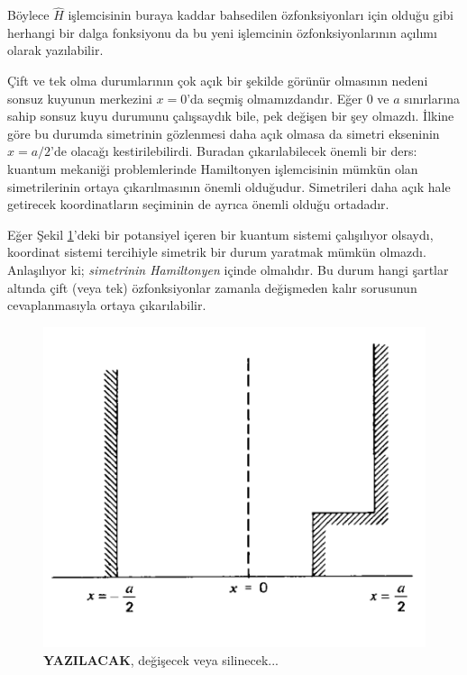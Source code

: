 \documentclass[a4paper,12pt, twoside]{article}
\newcommand{\YAZILACAK}{{\vspace{18pt}\bf\Large \color{red} YAZILACAK}}
\begin{document}
Böylece $\hat H$ işlemcisinin buraya kaddar bahsedilen özfonksiyonları için olduğu gibi herhangi bir dalga fonksiyonu da bu yeni işlemcinin özfonksiyonlarının açılımı olarak yazılabilir.

Çift ve tek olma durumlarının çok açık bir şekilde görünür olmasının nedeni sonsuz kuyunun merkezini $x=0$'da seçmiş olmamızdandır. Eğer $0$ ve $a$ sınırlarına sahip sonsuz kuyu durumunu çalışsaydık bile, pek değişen bir şey olmazdı. İlkine göre bu durumda simetrinin gözlenmesi daha açık olmasa da simetri ekseninin $x=a/2$'de olacağı kestirilebilirdi. Buradan çıkarılabilecek önemli bir ders: kuantum mekaniği problemlerinde Hamiltonyen işlemcisinin mümkün olan simetrilerinin ortaya çıkarılmasının önemli olduğudur. Simetrileri daha açık hale getirecek koordinatların seçiminin de ayrıca önemli olduğu ortadadır.

Eğer Şekil \ref{fig:nonSymmetricPot}'deki bir potansiyel içeren bir kuantum sistemi çalışılıyor olsaydı, koordinat sistemi tercihiyle simetrik bir durum yaratmak mümkün olmazdı. Anlaşılıyor ki; \emph{simetrinin Hamiltonyen} içinde olmalıdır. Bu durum hangi şartlar altında çift (veya tek) özfonksiyonlar zamanla değişmeden kalır sorusunun cevaplanmasıyla ortaya çıkarılabilir.
\begin{figure}[hbtp]
	\centering
	\includegraphics[width=0.5\linewidth]{figurler/non_symmetric_pot.png}
	\caption{\YAZILACAK, değişecek veya silinecek...}
	\label{fig:nonSymmetricPot}
\end{figure}
\end{document}
